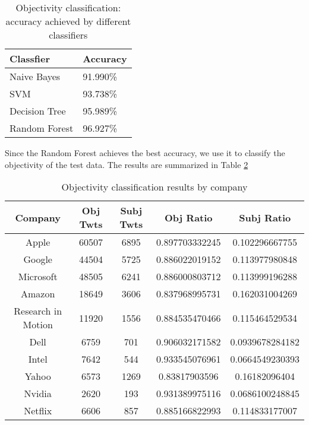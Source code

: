 \documentclass[12pt]{article}
\begin{document}
\begin{table}
\begin{center}
    \begin{tabular}{ | l || l | }
        \hline
        \textbf{Classfier} &  \textbf{Accuracy} \\ \hline
        \hline
        Naive Bayes &  91.990\% \\ \hline
        SVM & 93.738\% \\ \hline
        Decision Tree & 95.989\% \\ \hline
        Random Forest & 96.927\% \\ \hline
    \end{tabular}
\caption{Objectivity classification: accuracy achieved by different classifiers}
\label{classifiers-obj}
\end{center}
\end{table}

Since the Random Forest achieves the best accuracy, we use it to classify the objectivity of the test data. The results are summarized in Table \ref{objectivity-by-company}

\begin{table}
\begin{center}
    \begin{tabular}{ | c || c | c | c | c | }
        \hline
        \textbf{Company} &  \textbf{Obj Twts} & \textbf{Subj Twts} & \textbf{Obj Ratio} & \textbf{Subj Ratio} \\ \hline
        \hline
        Apple &  60507 & 6895 & 0.897703332245 & 0.102296667755 \\ \hline
        Google &  44504 & 5725 & 0.886022019152 & 0.113977980848 \\ \hline
        Microsoft &  48505 & 6241 & 0.886000803712 & 0.113999196288 \\ \hline
        Amazon &  18649 & 3606 & 0.837968995731 & 0.162031004269 \\ \hline
        Research in Motion  &  11920 & 1556 & 0.884535470466 & 0.115464529534 \\ \hline
        Dell &  6759 & 701 & 0.906032171582 & 0.0939678284182 \\ \hline
        Intel &  7642 & 544 & 0.933545076961 & 0.0664549230393 \\ \hline
        Yahoo &  6573 & 1269 & 0.83817903596 & 0.16182096404 \\ \hline
        Nvidia &  2620 & 193 & 0.931389975116 & 0.0686100248845 \\ \hline
        Netflix &  6606 & 857 & 0.885166822993 & 0.114833177007 \\ \hline
    \end{tabular}
\caption{Objectivity classification results by company}
\label{objectivity-by-company}
\end{center}
\end{table}
\end{document}
